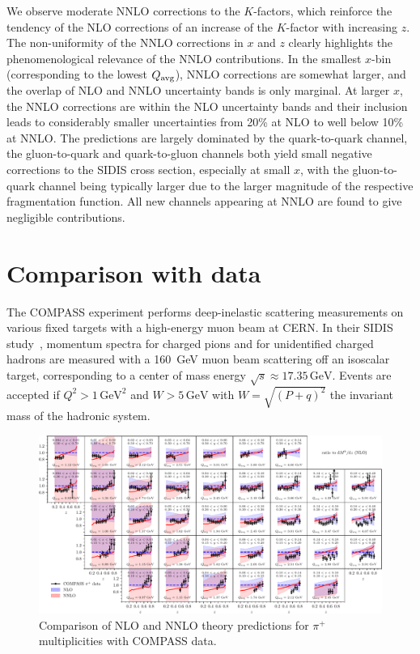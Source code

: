 \documentclass[10pt,aps,prl,twocolumn,preprintnumbers,nofootinbib]{revtex4-2}
\newcommand{\Qavg}{Q_{\rm avg}}
\newcommand{\GeV}{\mathrm{GeV}}
\begin{document}
We observe moderate NNLO corrections to the $K$-factors, which reinforce the
tendency of the NLO corrections of an increase of the $K$-factor with increasing
$z$. The non-uniformity of the NNLO corrections in $x$ and $z$ clearly
highlights the phenomenological relevance of the NNLO contributions.  In the
smallest $x$-bin (corresponding to the lowest $\Qavg$), NNLO corrections are
somewhat larger, and the overlap of NLO and NNLO uncertainty bands is only
marginal. At larger $x$, the NNLO corrections are within the NLO uncertainty
bands and their inclusion leads to considerably smaller uncertainties from 20\%
at NLO to well below 10\% at NNLO.  The predictions are largely dominated by the
quark-to-quark channel, the gluon-to-quark and quark-to-gluon channels both
yield small negative corrections to the SIDIS cross section, especially at small
$x$, with the gluon-to-quark channel being typically larger due to the larger
magnitude of the respective fragmentation function.  All new channels appearing
at NNLO are found to give negligible contributions.

\section{Comparison with data}\label{sec:CWD}

The COMPASS experiment performs deep-inelastic scattering measurements on
various fixed targets with a high-energy muon beam at CERN.  In their SIDIS
study~\cite{COMPASS:2016xvm}, momentum spectra for charged pions and for
unidentified charged hadrons are measured with a 160~GeV muon beam scattering off
an isoscalar target, corresponding to a center of mass energy $\sqrt{s} \approx
17.35\, \GeV$.  Events are accepted if $Q^2>1\,\GeV^2$ and $W>5\,\GeV$ with
$W=\sqrt{(P+q)^2}$ the invariant mass of the hadronic system.

\begin{figure}[t]
\includegraphics[width=\textwidth]{compass_data-crop.pdf}
\caption{Comparison of NLO and NNLO theory predictions for $\pi^+$ multiplicities with COMPASS data.}
\label{fig:compass}
\end{figure}
\end{document}
